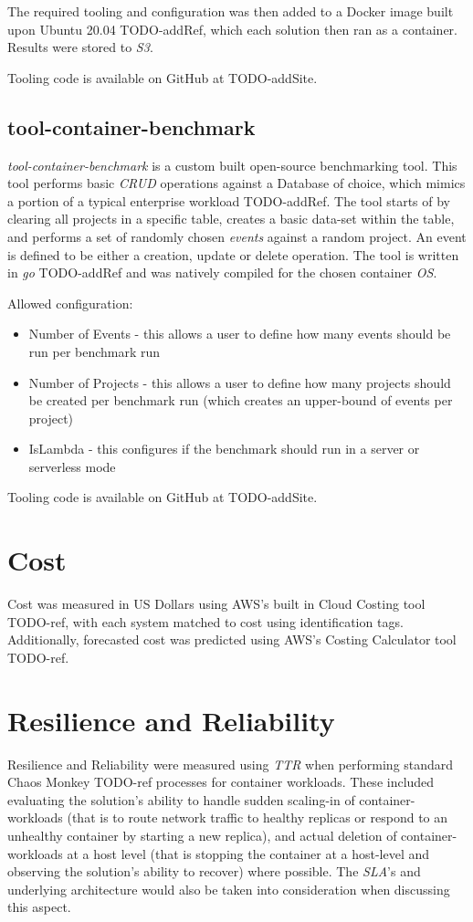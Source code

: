 The required tooling and configuration was then added to a Docker image built upon Ubuntu 20.04 TODO-addRef, which each solution then ran as a container.
Results were stored to \emph{S3}.

Tooling code is available on GitHub at TODO-addSite.

\subsection{tool-container-benchmark}
\textit{tool-container-benchmark} is a custom built open-source benchmarking tool. This tool performs basic \emph{CRUD} operations against a Database of choice,
which mimics a portion of a typical enterprise workload TODO-addRef. The tool starts of by clearing all projects in a specific table, creates a basic data-set within the table,
and performs a set of randomly chosen \textit{events} against a random project. An event is defined to be either a creation, update or delete operation.
The tool is written in \emph{go} TODO-addRef and was natively compiled for the chosen container \emph{OS}.

Allowed configuration:
\begin{itemize}
  \item Number of Events - this allows a user to define how many events should be run per benchmark run
  \item Number of Projects - this allows a user to define how many projects should be created per benchmark run (which creates an upper-bound of events per project)
  \item IsLambda - this configures if the benchmark should run in a server or serverless mode
\end{itemize}

Tooling code is available on GitHub at TODO-addSite.

\section{Cost}
Cost was measured in US Dollars using AWS's built in Cloud Costing tool TODO-ref, with each system matched to cost using identification tags.
Additionally, forecasted cost was predicted using AWS's Costing Calculator tool TODO-ref.

\section{Resilience and Reliability}
Resilience and Reliability were measured using \textit{TTR} when performing standard Chaos Monkey TODO-ref processes for container workloads.
These included evaluating the solution's ability to handle sudden scaling-in of container-workloads (that is to route network traffic to healthy replicas or respond to an unhealthy container by starting a new replica),
and actual deletion of container-workloads at a host level (that is stopping the container at a host-level and observing the solution's ability to recover) where possible.
The \textit{SLA}'s and underlying architecture would also be taken into consideration when discussing this aspect.

